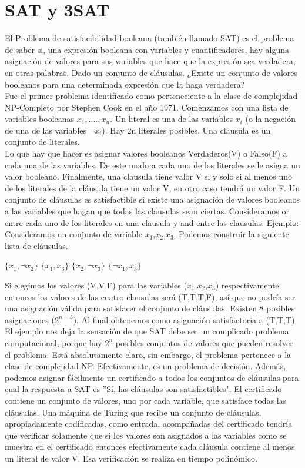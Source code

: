 \documentclass[12pt]{report}
\begin{document}
\section{SAT y 3SAT}
El Problema de satisfacibilidad booleana (también llamado SAT) es el problema de saber si, una expresión booleana con variables y cuantificadores, hay alguna asignación de valores para sus variables que hace que la expresión sea verdadera, en otras palabras, Dado un conjunto de cláusulas. ¿Existe un conjunto de valores booleanos para una determinada expresión que la haga verdadera? \\
Fue el primer problema identificado como perteneciente a la clase de complejidad NP-Completo por Stephen Cook en el año 1971.
Comenzamos con una lista de variables booleanas $x_1,....,x_n$. Un literal es una de las variables $x_i$ (o la negación de una de las variables $\neg x_i$). Hay 2n literales posibles. Una clausula es un conjunto de literales.\\
Lo que hay que hacer es asignar valores booleanos Verdaderos(V) o Falso(F) a cada una de las variables. De este modo a cada uno de los literales se le asigna un valor booleano. Finalmente, una clausula tiene valor V si y solo si al menos uno de los literales de la cláusula tiene un valor V, en otro caso tendrá un valor F.
Un conjunto de cláusulas es satisfactible si existe una asignación de valores booleanos a las variables que hagan que todas las clausulas sean ciertas. Consideramos or entre cada uno de los literales en una clausula y and entre las clausulas.
Ejemplo: Consideramos un conjunto de variable $x_1$,$x_2$,$x_3$. Podemos construir la siguiente lista de cláusulas.
\begin{center}
$\{x_1, \neg x_2 \}$ $\{x_1 , x_3\}$ $\{ x_2 , \neg x_3\}$ $\{ \neg x_1 , x_3\}$
\end{center}
Si elegimos los valores (V,V,F) para las variables ($x_1$,$x_2$,$x_3$) respectivamente, entonces los valores de las cuatro clausulas será (T,T,T,F), así que no podría ser una asignación válida para satisfacer el conjunto de cláusulas. Existen 8 posibles asignaciones ($2^{n=3}$). Al final obtenemos como asignación satisfactoria a (T,T,T).\\
El ejemplo nos deja la sensación de que SAT debe ser un complicado problema computacional, porque hay $2^n$ posibles conjuntos de valores que pueden resolver el problema. Está absolutamente claro, sin embargo, el problema pertenece a la clase de complejidad NP. Efectivamente, es un problema de decisión. Además, podemos asignar fácilmente un certificado a todos los conjuntos de cláusulas para cual la respuesta a SAT es ''Sí, las cláusulas son satisfactibles". El certificado contiene un conjunto de valores, uno por cada variable, que satisface todas las cláusulas. Una máquina de Turing que recibe un conjunto de cláusulas, apropiadamente codificadas, como entrada, acompañadas del certificado tendría que verificar solamente que si los valores son asignados a las variables como se muestra en el certificado entonces efectivamente cada cláusula contiene al menos un literal de valor V. Esa verificación se realiza en tiempo polinómico.\\
\end{document}
